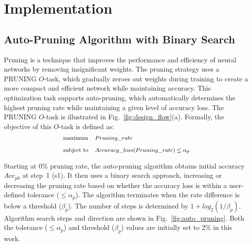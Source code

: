 \section{Implementation}

\subsection{Auto-Pruning Algorithm with Binary Search}
Pruning is a technique that improves the performance and efficiency of neural networks by removing insignificant weights. The pruning strategy uses a PRUNING $O$-task, which gradually zeroes out weights during training to create a more compact and efficient network while maintaining accuracy. This optimization task supports auto-pruning, which automatically determines the highest pruning rate while maintaining a given level of accuracy loss. The PRUNING $O$-task is illustrated in Fig.~\ref{fig:design_flow}(a). Formally, the objective of this $O$-task is defined as:
\begin{equation}
\begin{footnotesize}
\begin{aligned}
& \underset{}{\text{maximum}}
& & Pruning\_rate \\
& \text{subject to}
& & Accuracy\_loss(Pruning\_rate) \leq \alpha_p 
\end{aligned}
\end{footnotesize}
\end{equation}

Starting at 0\% pruning rate, the auto-pruning algorithm obtains initial accuracy
$Acc_{p0}$ at step~1 (s1).
It then uses a binary search approach, increasing or decreasing the pruning rate based on whether the accuracy loss is within a user-defined tolerance ($\leq \alpha_{p}$). The algorithm terminates when the rate difference is below a threshold ($\beta_{p}$). The number of steps is determined by $1+log_{2}(1/\beta_{p})$. Algorithm search steps and direction are shown in Fig.~\ref{fig:auto_pruning}.
Both the tolerance ($\leq \alpha_{p}$) and threshold ($\beta_{p}$) values are initially set to 2\% in this work.  %

